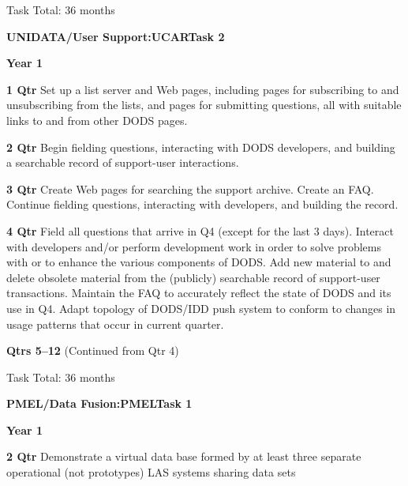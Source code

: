\documentclass[12pt]{article}
\begin{document}
\begin{description}
\begin{description}
 Task Total: 36 months

   \end{description}
\begin{center}
{\large \bf UNIDATA/User Support:UCARTask 2}
\end{center}

 \item{\large \bf Year 1}
   \begin{description}

   \item{\bf 1 Qtr} Set up a list server and Web pages, including pages for
     subscribing to and unsubscribing from the lists, and pages for
     submitting questions, all with suitable links to and from other DODS
     pages.

   \item{\bf 2 Qtr} Begin fielding questions, interacting with DODS
     developers, and building a searchable record of support-user
     interactions. 

   \item{\bf 3 Qtr} Create Web pages for searching the support archive.
     Create an FAQ.  Continue fielding questions, interacting with
     developers, and building the record.

   \item{\bf 4 Qtr} Field all questions that arrive in Q4 (except for the
     last 3 days).  Interact with developers and/or perform development work
     in order to solve problems with or to enhance the various components of
     DODS.  Add new material to and delete obsolete material from the
     (publicly) searchable record of support-user transactions.  Maintain the
     FAQ to accurately reflect the state of DODS and its use in Q4. Adapt
     topology of DODS/IDD push system to conform to changes in usage patterns
     that occur in current quarter.

   \item{\bf Qtrs 5--12} (Continued from Qtr 4)

 Task Total: 36 months


   \end{description}
\begin{center}
{\large \bf PMEL/Data Fusion:PMELTask 1}
\end{center}

 \item{\large \bf Year 1}
   \begin{description}

   \item{\bf 2 Qtr} Demonstrate a virtual data base formed by at least three
     separate operational (not prototypes) LAS systems sharing data sets 


\end{description}
\end{description}
\end{document}
